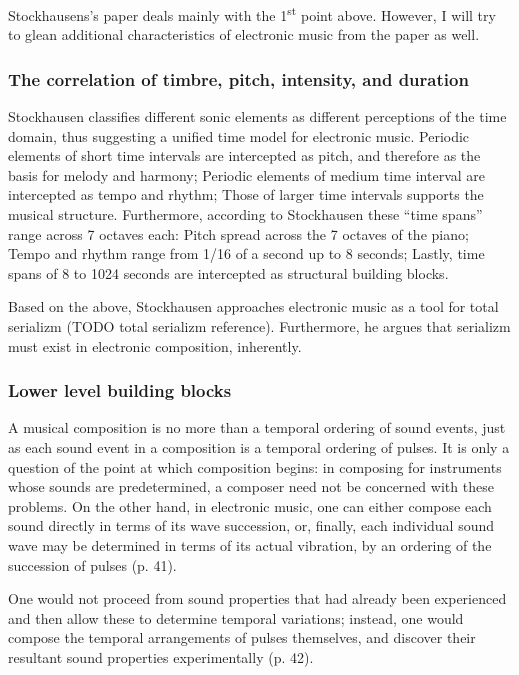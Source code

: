 \documentclass[a4paper,11pt]{article}
\newenvironment{MyShadequote}[1][]{%
    \ignorespaces%
    \begin{mdframed}[style=MyShadeQuoteStyle,#1]%
}{%
    \end{mdframed}%
    \ignorespacesafterend%
}%
\begin{document}
Stockhausens's paper deals mainly with the 1\textsuperscript{st} point above.
However, I will try to glean additional characteristics of electronic music from the paper as well.

\subsubsection{The correlation of timbre, pitch, intensity, and duration}
\label{subs:stockhausen:time}

Stockhausen classifies different sonic elements as different perceptions of the time domain, thus suggesting a unified time model for electronic music.
Periodic elements of short time intervals are intercepted as pitch, and therefore as the basis for melody and harmony;
Periodic elements of medium time interval are intercepted as tempo and rhythm;
Those of larger time intervals supports the musical structure.
Furthermore, according to Stockhausen these ``time spans'' range across 7 octaves each:
Pitch spread across the 7 octaves of the piano;
Tempo and rhythm range from 1/16 of a second up to 8 seconds;
Lastly, time spans of 8 to 1024 seconds are intercepted as structural building blocks.

Based on the above, Stockhausen approaches electronic music as a tool for total serializm (TODO total serializm reference).
Furthermore, he argues that serializm must exist in electronic composition, inherently.

\subsubsection{Lower level building blocks}
\label{subs:stockhausen:sound}

\begin{MyShadequote}
  A musical composition is no more than a temporal ordering of sound events, just as each sound event in a composition is a temporal ordering of pulses.
  It is only a question of the point at which composition begins:
  in composing for instruments whose sounds are predetermined, a composer need not be concerned with these problems.
  On the other hand, in electronic music, one can either compose each sound directly in terms of its wave succession, or, finally, each individual sound wave may be determined in terms of its actual vibration, by an ordering of the succession of pulses (p. 41).
\end{MyShadequote}

\begin{MyShadequote}
  One would not proceed from sound properties that had already been experienced and then allow these to determine temporal variations;
  instead, one would compose the temporal arrangements of pulses themselves, and discover their resultant sound properties experimentally (p. 42).
\end{MyShadequote}
\end{document}
